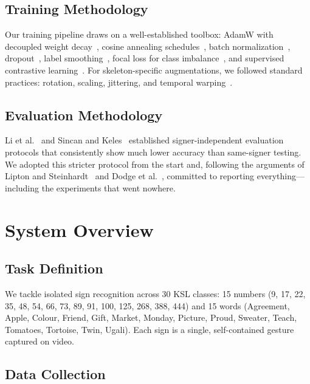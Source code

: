 \documentclass[conference]{IEEEtran}
\begin{document}
\subsection{Training Methodology}

Our training pipeline draws on a well-established toolbox: AdamW with decoupled weight decay~\cite{loshchilov2019adamw}, cosine annealing schedules~\cite{loshchilov2017cosine}, batch normalization~\cite{ioffe2015}, dropout~\cite{srivastava2014}, label smoothing~\cite{szegedy2016, muller2019}, focal loss for class imbalance~\cite{lin2017focal}, and supervised contrastive learning~\cite{khosla2020supcon}. For skeleton-specific augmentations, we followed standard practices: rotation, scaling, jittering, and temporal warping~\cite{kolawole2024augmentation}.

\subsection{Evaluation Methodology}

Li et al.~\cite{li2020wlasl} and Sincan and Keles~\cite{sincan2020autsl} established signer-independent evaluation protocols that consistently show much lower accuracy than same-signer testing. We adopted this stricter protocol from the start and, following the arguments of Lipton and Steinhardt~\cite{lipton2019} and Dodge et al.~\cite{dodge2019}, committed to reporting everything---including the experiments that went nowhere.

\section{System Overview}

\subsection{Task Definition}

We tackle isolated sign recognition across 30 KSL classes: 15 numbers (9, 17, 22, 35, 48, 54, 66, 73, 89, 91, 100, 125, 268, 388, 444) and 15 words (Agreement, Apple, Colour, Friend, Gift, Market, Monday, Picture, Proud, Sweater, Teach, Tomatoes, Tortoise, Twin, Ugali). Each sign is a single, self-contained gesture captured on video.

\subsection{Data Collection}
\end{document}
